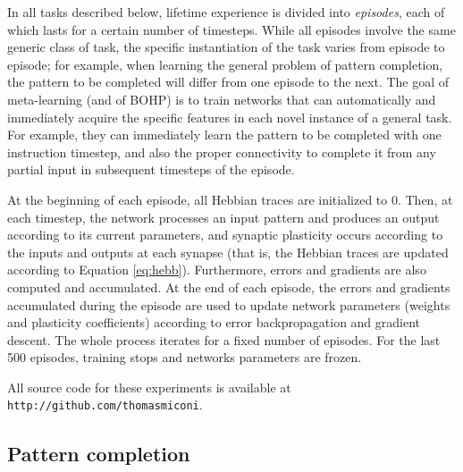 \documentclass{article}
\begin{document}
In all tasks described below, lifetime experience is divided into
\emph{episodes}, each of which lasts for a certain number of timesteps. While
all episodes involve the same generic class of task, the specific instantiation
of the task varies from episode to episode; for example, when learning the
general problem of pattern completion, the pattern to be completed will differ
from one episode to the next. The goal of meta-learning (and of BOHP) is to
train networks that can automatically and immediately acquire the specific
features in each novel instance of a general task. For example, they can
immediately learn the pattern to be completed with one instruction timestep,
and also the proper connectivity to complete it from any partial input in
subsequent timesteps of the episode.

At the
beginning of each episode, all Hebbian traces are initialized to 0. Then,
at each timestep, the network processes an input pattern and produces an output
according to its current parameters, and synaptic plasticity occurs according to the inputs and outputs at each synapse (that is, the Hebbian traces are updated
according to Equation \ref{eq:hebb}). Furthermore, errors and gradients are also
computed and accumulated. At the end of each episode, the errors and gradients accumulated during the episode
are used to update network parameters (weights and plasticity coefficients)
according to error backpropagation and gradient descent. The whole process
iterates for a fixed number of episodes. For the last 500 episodes, training
stops and networks parameters are frozen.

All source code for these experiments is available at \texttt{http://github.com/thomasmiconi}.

\subsection{Pattern completion}
\end{document}
